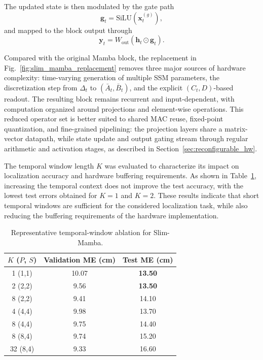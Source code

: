 \documentclass[lettersize,journal]{IEEEtran}
\begin{document}
The updated state is then modulated by the gate path
\begin{equation}
\mathbf{g}_t = \mathrm{SiLU}(\mathbf{x}^{(g)}_t),
\label{eq:slim_mamba_gate}
\end{equation}
and mapped to the block output through
\begin{equation}
\mathbf{y}_t = W_{\mathrm{out}}(\mathbf{h}_t \odot \mathbf{g}_t).
\label{eq:slim_mamba_output}
\end{equation}

Compared with the original Mamba block, the replacement in
Fig.~\ref{fig:slim_mamba_replacement} removes three major sources of hardware
complexity: time-varying generation of multiple SSM
parameters, the discretization step from \(\Delta_t\) to
\((\bar{A}_t,\bar{B}_t)\), and the explicit \((C_t,D)\)-based readout. The
resulting block remains recurrent and input-dependent, with computation
organized around projections and element-wise operations. This reduced
operator set is better suited to shared MAC reuse, fixed-point quantization,
and fine-grained pipelining: the projection layers share a matrix-vector
datapath, while state update and output gating stream through regular
arithmetic and activation stages, as described in
Section~\ref{sec:reconfigurable_hw}.

The temporal window length $K$ was evaluated to characterize its impact on localization accuracy and hardware buffering requirements. As shown in Table~\ref{tab:k_ablation_tcas}, increasing the temporal context does not improve the test accuracy, with the lowest test errors obtained for $K=1$ and $K=2$. These results indicate that short temporal windows are sufficient for the considered localization task, while also reducing the buffering requirements of the hardware implementation.
\begin{table}[!t]
\caption{Representative temporal-window ablation for Slim-Mamba.}
\label{tab:k_ablation_tcas}
\begin{center}
\footnotesize
\setlength{\tabcolsep}{6pt}
\renewcommand{\arraystretch}{1.08}
\begin{tabular}{|c|c|c|}
\hline
\textbf{\(K\) (\(P\), \(S\))}
& \textbf{Validation ME (cm)}
& \textbf{Test ME (cm)} \\
\hline
1 (1,1) & 10.07 & \textbf{13.50} \\
\hline
2 (2,2) & 9.56 & \textbf{13.50} \\
\hline
8 (2,2) & 9.41 & 14.10 \\
\hline
4 (4,4) & 9.98 & 13.70 \\
\hline
8 (4,4) & 9.75 & 14.40 \\
\hline
8 (8,4) & 9.74 & 15.20 \\
\hline
32 (8,4) & 9.33 & 16.60 \\
\hline
\end{tabular}
\end{center}
\end{table}
\end{document}
